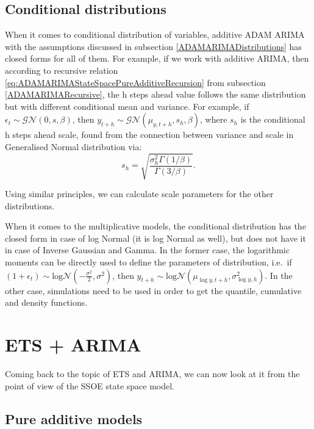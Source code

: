 \documentclass[
]{book}
\theoremstyle{definition}
\theoremstyle{definition}
\theoremstyle{definition}
\theoremstyle{definition}
\theoremstyle{remark}
\begin{document}
\hypertarget{conditional-distributions}{%
\subsection{Conditional distributions}\label{conditional-distributions}}

When it comes to conditional distribution of variables, additive ADAM ARIMA with the assumptions discussed in subsection \ref{ADAMARIMADistributions} has closed forms for all of them. For example, if we work with additive ARIMA, then according to recursive relation \eqref{eq:ADAMARIMAStateSpacePureAdditiveRecursion} from subsection \ref{ADAMARIMARecursive}, the h steps ahead value follows the same distribution but with different conditional mean and variance. For example, if \(\epsilon_t \sim \mathcal{GN}(0, s, \beta)\), then \(y_{t+h} \sim \mathcal{GN}(\mu_{y,t+h}, s_{h}, \beta)\), where \(s_{h}\) is the conditional h steps ahead scale, found from the connection between variance and scale in Generalised Normal distribution via:
\begin{equation*}
    s_h = \sqrt{\frac{\sigma^2_h \Gamma(1/\beta)}{\Gamma(3/\beta)}}.
\end{equation*}

Using similar principles, we can calculate scale parameters for the other distributions.

When it comes to the multiplicative models, the conditional distribution has the closed form in case of log Normal (it is log Normal as well), but does not have it in case of Inverse Gaussian and Gamma. In the former case, the logarithmic moments can be directly used to define the parameters of distribution, i.e.~if \(\left(1+\epsilon_t \right) \sim \text{log}\mathcal{N}\left(-\frac{\sigma^2}{2}, \sigma^2\right)\), then \(y_{t+h} \sim \text{log}\mathcal{N}\left(\mu_{\log y,t+h}, \sigma^2_{\log y,h} \right)\). In the other case, simulations need to be used in order to get the quantile, cumulative and density functions.

\hypertarget{ETSAndARIMA}{%
\section{ETS + ARIMA}\label{ETSAndARIMA}}

Coming back to the topic of ETS and ARIMA, we can now look at it from the point of view of the SSOE state space model.

\hypertarget{pure-additive-models}{%
\subsection{Pure additive models}\label{pure-additive-models}}
\end{document}
